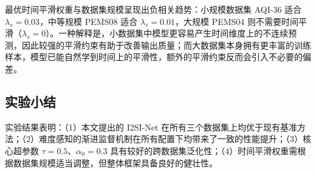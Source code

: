 最优时间平滑权重与数据集规模呈现出负相关趋势：小规模数据集 AQI-36 适合 $\lambda_s=0.03$，中等规模 PEMS08 适合 $\lambda_s=0.01$，大规模 PEMS04 则不需要时间平滑（$\lambda_s=0$）。一种解释是，小数据集中模型更容易产生时间维度上的不连续预测，因此较强的平滑约束有助于改善输出质量；而大数据集本身拥有更丰富的训练样本，模型已能自然学到时间上的平滑性，额外的平滑约束反而会引入不必要的偏差。

\subsection{实验小结}

实验结果表明：（1）本文提出的 I2SI-Net 在所有三个数据集上均优于现有基准方法；（2）难度感知的渐进监督机制在所有配置下均带来了一致的性能提升；（3）核心超参数 $\tau=0.5$、$\alpha_0=0.3$ 具有较好的跨数据集泛化性；（4）时间平滑权重需根据数据集规模适当调整，但整体框架具备良好的健壮性。
